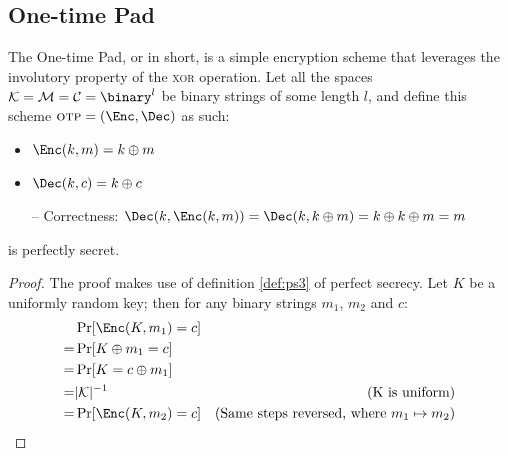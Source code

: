\subsection{One-time Pad}

The One-time Pad, or \otp{} in short, is a simple encryption scheme that leverages the involutory property of the \textsc{xor} operation. Let all the spaces $\K = \M = \C = \binary^l$ be binary strings of some length $l$, and define this scheme $\otp = (\Enc, \Dec)$ as such:
\begin{itemize}
    \item $\Enc(k, m) = k \oplus m$
    \item $\Dec(k, c) = k \oplus c$
    \item[--] Correctness: $\Dec(k, \Enc(k, m)) = \Dec(k, k \oplus m) = k \oplus k \oplus m = m$
\end{itemize}

\begin{theorem}
    \otp{} is perfectly secret.
\end{theorem}
\begin{proof}
    The proof makes use of definition \ref{def:ps3} of perfect secrecy. Let $K$ be a uniformly random key; then for any binary strings $m_1$, $m_2$ and $c$:
    \begin{align*}
        & \Pr[\Enc(K, m_1) = c]     & \\
        =& \Pr[K \oplus m_1 = c]    & \\
        =& \Pr[K = c \oplus m_1]    & \\
        =& |\K|^{-1}                & \text{(K is uniform)} \\
        =& \Pr[\Enc(K, m_2) = c]    & \text{(Same steps reversed, where $m_1 \mapsto m_2$)}  
    \end{align*}
\end{proof}


